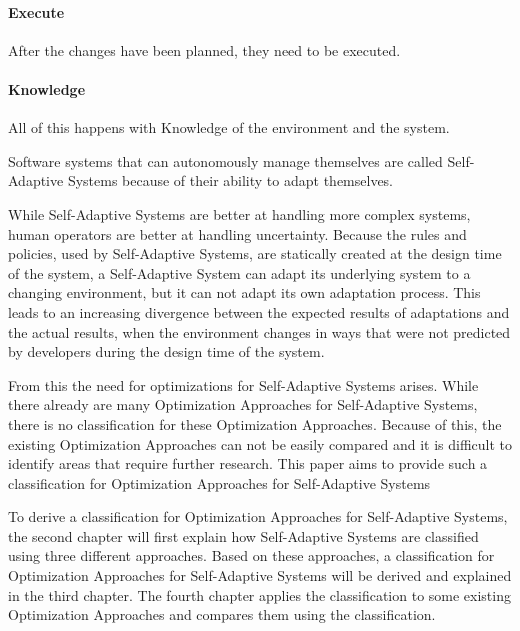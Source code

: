 \paragraph*{Execute} After the changes have been planned, they need to be executed.
\paragraph*{Knowledge} All of this happens with Knowledge of the environment and the system.
\newline
\par


Software systems that can autonomously manage themselves are called Self-Adaptive Systems
because of their ability to adapt themselves.
\newline
\par



While Self-Adaptive Systems are better at handling more complex systems,
human operators are better at handling uncertainty.
Because the rules and policies, used by Self-Adaptive Systems,
are statically created at the design time of the system, a Self-Adaptive System can adapt its underlying system to a changing environment,
but it can not adapt its own adaptation process.
This leads to an increasing divergence between the expected results of adaptations and the actual results,
when the environment changes in ways that were not predicted by developers during the design time of the system.
\newline
\par


From this the need for optimizations for Self-Adaptive Systems arises.
While there already are many Optimization Approaches for Self-Adaptive Systems,
there is no classification for these Optimization Approaches.
Because of this, the existing Optimization Approaches can not be easily compared
and it is difficult to identify areas that require further research.
This paper aims to provide such a classification for Optimization Approaches for Self-Adaptive Systems
\newline
\par


To derive a classification for Optimization Approaches for Self-Adaptive Systems,
the second chapter will first explain how Self-Adaptive Systems are classified
using three different approaches.
Based on these approaches, a classification for Optimization Approaches for Self-Adaptive Systems will be derived
and explained in the third chapter.
The fourth chapter applies the classification to some existing Optimization Approaches
and compares them using the classification.

